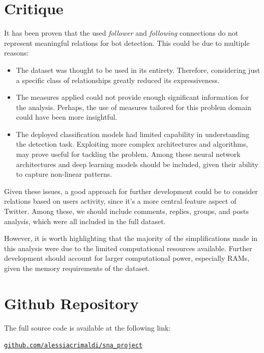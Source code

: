 \documentclass[12pt, a4paper]{article}
\begin{document}
\section{Critique} \label{critique}
	It has been proven that the used \textit{follower} and \textit{following} connections do not represent meaningful relations for bot detection. This could be due to multiple reasons:
	\begin{itemize}
		\item The dataset was thought to be used in its entirety. Therefore, considering just a specific class of relationships greatly reduced its expressiveness.
		\item The measures applied could not provide enough significant information for the analysis. Perhaps, the use of measures tailored for this problem domain could have been more insightful.
		\item The deployed classification models had limited capability in understanding the detection task. Exploiting more complex architectures and algorithms, may prove useful for tackling the problem. Among these neural network architectures and deep learning models should be included, given their ability to capture non-linear patterns.
	\end{itemize}
	Given these issues, a good approach for further development could be to consider relations based on users activity, since it's a more central feature aspect of Twitter. Among these, we should include comments, replies, groups, and posts analysis, which were all included in the full dataset.
	\vspace{0.2cm}
	
	However, it is worth highlighting that the majority of the simplifications made in this analysis were due to the limited computational resources available. Further development should account for larger computational power, especially RAMs, given the memory requirements of the dataset.
	
	
\newpage




\newpage
\appendix
\section{Github Repository}
	The full source code is available at the following link:
	
	\href{https://github.com/alessiacrimaldi/sna_project}{\texttt{github.com/alessiacrimaldi/sna\_project}}
\end{document}
